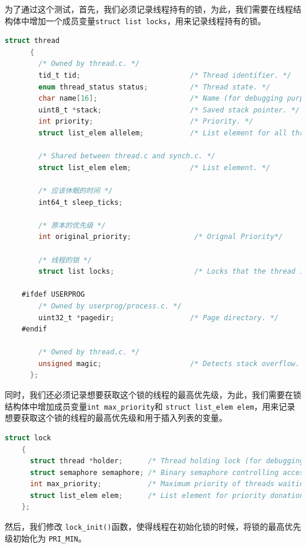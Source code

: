 \documentclass{article}
\begin{document}
为了通过这个测试，首先，我们必须记录线程持有的锁，为此，我们需要在线程结构体中增加一个成员变量\texttt{struct list locks}，用来记录线程持有的锁。

\begin{lstlisting}[language=C, title=修改后的线程结构体]
      struct thread
      {
        /* Owned by thread.c. */
        tid_t tid;                          /* Thread identifier. */
        enum thread_status status;          /* Thread state. */
        char name[16];                      /* Name (for debugging purposes). */
        uint8_t *stack;                     /* Saved stack pointer. */
        int priority;                       /* Priority. */
        struct list_elem allelem;           /* List element for all threads list. */

        /* Shared between thread.c and synch.c. */
        struct list_elem elem;              /* List element. */

        /* 应该休眠的时间 */
        int64_t sleep_ticks;

        /* 原本的优先级 */
        int original_priority;               /* Orignal Priority*/

        /* 线程的锁 */
        struct list locks;                   /* Locks that the thread is holding */

    #ifdef USERPROG
        /* Owned by userprog/process.c. */
        uint32_t *pagedir;                  /* Page directory. */
    #endif

        /* Owned by thread.c. */
        unsigned magic;                     /* Detects stack overflow. */
      };

\end{lstlisting}

同时，我们还必须记录想要获取这个锁的线程的最高优先级，为此，我们需要在锁结构体中增加成员变量\texttt{int max\_priority}和 \texttt{struct list\_elem elem}，用来记录想要获取这个锁的线程的最高优先级和用于插入列表的变量。

\begin{lstlisting}[language=C, title=修改后的锁结构体]
    struct lock 
    {
      struct thread *holder;      /* Thread holding lock (for debugging). */
      struct semaphore semaphore; /* Binary semaphore controlling access. */
      int max_priority;           /* Maximum priority of threads waiting for lock. */
      struct list_elem elem;      /* List element for priority donation. */
    };
\end{lstlisting}

然后，我们修改 \texttt{lock\_init()}函数，使得线程在初始化锁的时候，将锁的最高优先级初始化为 \texttt{PRI\_MIN}。
\end{document}
